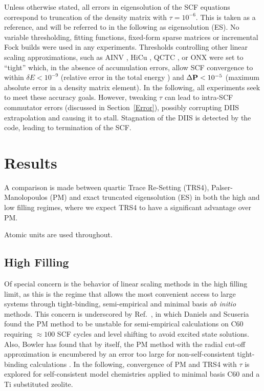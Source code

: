 \commentoutA{\documentclass[prl,aps,twocolumn,showpacs,twocolumngrid,superbib]{revtex4}}
\begin{document}
Unless otherwise stated, all errors in eigensolution of the SCF equations correspond to 
truncation of the density matrix with $\tau=10^{-6}$.  This is taken as a reference, and will be
referred to in the following as eigensolution (ES).  No variable thresholding, fitting functions,
fixed-form sparse matrices or incremental Fock builds were used in any experiments.  Thresholds 
controlling other linear scaling approximations, such as 
AINV \cite{MChallacombe99,MBenzi01,MChallacombe03B}, 
HiCu \cite{MChallacombe00A,CGan03},  
QCTC \cite{MChallacombe96,MChallacombe96B,MChallacombe97,MChallacombe03A}, or
ONX \cite{ESchwegler96,ESchwegler97,ESchwegler98A,ESchwegler98C,ESchwegler99,ESchwegler00}
were set to ``tight''  which, in the absence of accumulation errors, allow SCF convergence to within 
$\delta E < 10^{-9}$ (relative error in the total energy ) and 
$\Delta{\bf P} < 10^{-5}$ (maximum absolute error in a density matrix element). In the following, all 
experiments seek to meet these accuracy goals.  However, tweaking $\tau$  can lead to intra-SCF commutator 
errors (discussed in Section~\ref{Error}), possibly corrupting DIIS extrapolation \cite{PPulay80,PPulay82} and 
causing it to stall.  Stagnation of the DIIS is detected by the code, leading to termination of the SCF.

\section{Results}\label{results}

A comparison is made between quartic Trace Re-Setting (TRS4), Palser-Manolopoulos \cite{APalser99}  
(PM) and exact truncated eigensolution (ES) in both the high and low filling regimes, where we expect 
TRS4 to have a significant advantage over PM.

\smallskip
Atomic units are used throughout. 

\subsection{High Filling}

Of special concern is the behavior of linear scaling methods in the high filling limit,
as this is the regime that allows the most convenient access to large systems through
tight-binding, semi-empirical and minimal basis {\em ab initio} methods.
This concern is underscored by Ref.~, in which Daniels and Scuseria 
found the PM method to be unstable for semi-empirical calculations on C60 requiring  
$\approx 100$ SCF cycles and level shifting to avoid excited state solutions.
Also, Bowler has found that by itself, the PM method with the radial cut-off approximation 
is encumbered by an error too large for non-self-consistent tight-binding calculations \cite{DBowler99}.  
In the following,  convergence of PM and TRS4 with $\tau$ is explored for self-consistent model 
chemistries applied to minimal basis C60 and a Ti substituted zeolite.
\end{document}
